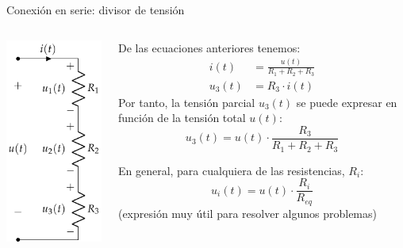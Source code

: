 \documentclass[aspectratio=169, xcolor={usenames,svgnames,dvipsnames}]{beamer}
\begin{document}

\begin{frame}{Conexión en serie: \hspace{2mm}divisor de tensión}
    \begin{columns}
    \begin{column}{0.3\columnwidth}
        \begin{center}
            \includegraphics[height=0.85\textheight]{../figs/AsociacionSerie.pdf}
        \end{center}
    \end{column}
    \begin{column}{0.7\columnwidth}
        \vspace{2mm}
    
        De las ecuaciones anteriores tenemos:
        \vspace{-2mm}
        \begin{align*}
          i(t) &= \frac{u(t)}{R_1 + R_2 + R_3}\\
          u_3(t) &= R_3 \cdot i(t)
        \end{align*}        
        Por tanto, la \alert{tensión parcial} \(u_3(t)\) se puede expresar en función de la tensión total \(u(t)\): 
        \vspace{-2mm}
        \begin{equation*}
          u_3(t) = u(t) \cdot \frac{R_3}{R_1 + R_2 + R_3}  
        \end{equation*}
        
        \alert{En general}, para cualquiera de las resistencias, $R_i$:
        \begin{equation*}
          \boxed{u_i(t) = u(t) \cdot \frac{R_i}{R_{eq}}}
        \end{equation*}
        \centering \small{(expresión muy útil para resolver algunos problemas)}
    \end{column}
    \end{columns}
\end{frame}
\end{document}
